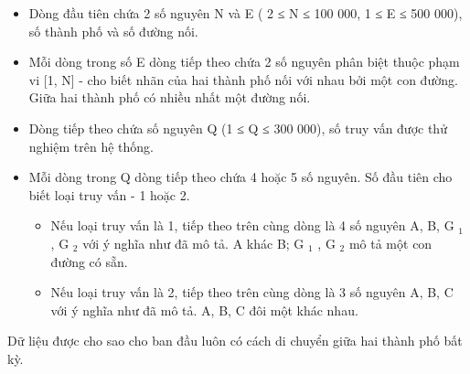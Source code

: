 \begin{itemize}
	\item     Dòng đầu tiên chứa 2 số nguyên N và E ( 2 ≤ N ≤ 100 000, 1 ≤ E ≤ 500 000), số thành phố và số đường nối.   
	\item     Mỗi dòng trong số E dòng tiếp theo chứa 2 số nguyên phân biệt thuộc phạm vi [1, N] - cho biết nhãn của hai thành phố nối với nhau bởi một con đường. Giữa hai thành phố có nhiều nhất một đường nối.   
	\item     Dòng tiếp theo chứa số nguyên Q (1 ≤ Q ≤ 300 000), số truy vấn được thử nghiệm trên hệ thống.   
	\item     Mỗi dòng trong Q dòng tiếp theo chứa 4 hoặc 5 số nguyên. Số đầu tiên cho biết loại truy vấn - 1 hoặc 2.    
\begin{itemize}
	\item       Nếu loại truy vấn là 1, tiếp theo trên cùng dòng là 4 số nguyên A, B, G      $_       1      $      , G      $_       2      $      với ý nghĩa như đã mô tả. A khác B; G      $_       1      $      , G      $_       2      $      mô tả một con đường có   sẵn.     
	\item       Nếu loại truy vấn là 2, tiếp theo trên cùng dòng là 3 số nguyên A, B, C với ý nghĩa như đã mô tả. A, B, C đôi một khác nhau.     
\end{itemize}
\end{itemize}

   Dữ liệu được cho sao cho ban đầu luôn có cách di chuyển giữa hai thành phố bất kỳ.